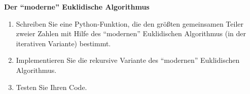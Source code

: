 \textbf{Der ``moderne'' Euklidische Algorithmus}
\begin{enumerate}
	\item Schreiben Sie eine Python-Funktion, die den größten gemeinsamen Teiler zweier Zahlen mit Hilfe des ``modernen'' Euklidischen Algorithmus (in der iterativen Variante) bestimmt.
	\item Implementieren Sie die rekursive Variante des ``modernen'' Euklidischen Algorithmus.
	\item Testen Sie Ihren Code.
\end{enumerate}
%
